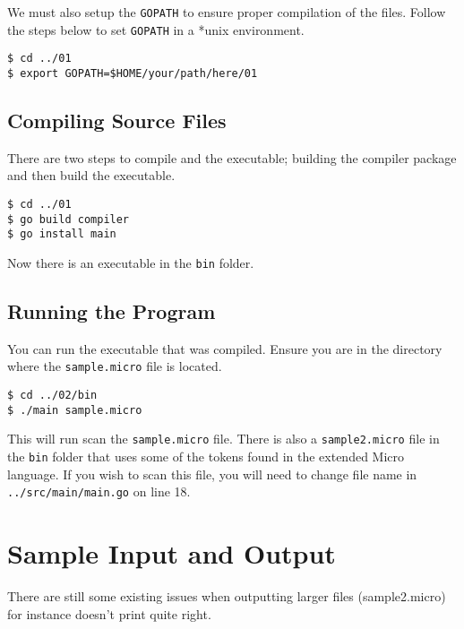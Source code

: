 \documentclass[a4paper]{article}
\begin{document}
We must also setup the \verb~GOPATH~ to ensure proper compilation of the files.
Follow the steps below to set \verb~GOPATH~ in a *unix environment. 
\begin{verbatim}
$ cd ../01
$ export GOPATH=$HOME/your/path/here/01
\end{verbatim}

\subsection{Compiling Source Files}
\label{sec-2-3}
There are two steps to compile and the executable; building the compiler
package and then build the executable.
\begin{verbatim}
$ cd ../01
$ go build compiler
$ go install main
\end{verbatim}
Now there is an executable in the \verb~bin~ folder.

\subsection{Running the Program}
\label{sec-2-4}
You can run the executable that was compiled. Ensure you are in the 
directory where the \verb~sample.micro~ file is located.
\begin{verbatim}
$ cd ../02/bin
$ ./main sample.micro
\end{verbatim}
This will run scan the \verb~sample.micro~ file. There is also a \verb~sample2.micro~
file in the \verb~bin~ folder that uses some of the tokens found in the 
extended Micro language. If you wish to scan this file, you will need to
change file name in \verb~../src/main/main.go~ on line 18.

\section{Sample Input and Output}
\label{sec-3}
There are still some existing issues when outputting larger files (sample2.micro) for instance
doesn't print quite right. 
\end{document}

